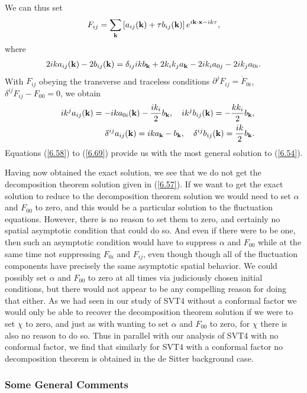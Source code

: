 %
We can thus set 
%
\begin{eqnarray}
F_{ij}=\sum_{\bf k}\left[a_{ij}({\bf k})+\tau b_{ij}({\bf k})\right]e^{i{\bf k}\cdot {\bf x}-ik\tau},
\label{6.67}
\end{eqnarray}
%
where 
%
\begin{eqnarray}
2ika_{ij}({\bf k})-2b_{ij}({\bf k})=\delta_{ij}ikb_{\bf k}+2k_ik_ja_{\bf k}-2ik_ia_{0j}-2ik_ja_{0i}.
\label{6.68}
\end{eqnarray}
%
With $F_{ij}$ obeying the transverse and traceless conditions $\partial^{j}F_{ij}=\dot{F}_{0i}$, $\delta^{ij}F_{ij}-F_{00}=0$, we obtain 
%
\begin{eqnarray}
&&ik^ja_{ij}({\bf k})=-ika_{0i}({\bf k})-\frac{ik_i}{2}b_{\bf k},\quad ik^jb_{ij}({\bf k})=-\frac{kk_i}{2}b_{\bf k}, 
\nonumber\\
&&
\delta^{ij}a_{ij}({\bf k})=ika_{\bf k}-b_{\bf k},
\quad \delta^{ij}b_{ij}({\bf k})=\frac{ik}{2}b_{\bf k}.
\label{6.69}
\end{eqnarray}
%
Equations (\ref{6.58}) to (\ref{6.69}) provide us with the most general solution to (\ref{6.54}).


Having now obtained the exact solution, we see that  we do not get the decomposition theorem solution given in (\ref{6.57}). If we want to get the exact solution to reduce to the decomposition theorem solution we would need to set $\alpha$ and $F_{00}$ to zero, and this would be a particular solution to the fluctuation equations. However, there is no reason to set them to zero, and certainly no spatial asymptotic condition that could do so. And even if there were to be one, then such an asymptotic condition would have to suppress $\alpha$ and $F_{00}$ while at the same time not suppressing $F_{0i}$ and $F_{ij}$, even though though all of the fluctuation components have precisely the same asymptotic spatial behavior. We could possibly set $\alpha$ and $F_{00}$ to zero at all times via judiciously chosen initial conditions, but there would not appear to be any compelling reason for doing that either. As we had seen in our study of SVT4 without a conformal factor we would only be able to recover the decomposition theorem solution if we were to set $\chi$ to zero, and just as with wanting to set $\alpha$ and $F_{00}$ to zero, for $\chi$ there is also no reason  to do so. Thus in parallel with our analysis of SVT4 with no conformal factor, we find that similarly for SVT4 with a conformal factor no decomposition theorem is obtained in the de Sitter background case.


\subsubsection{Some General Comments}
\label{sss:some_general_comments}

